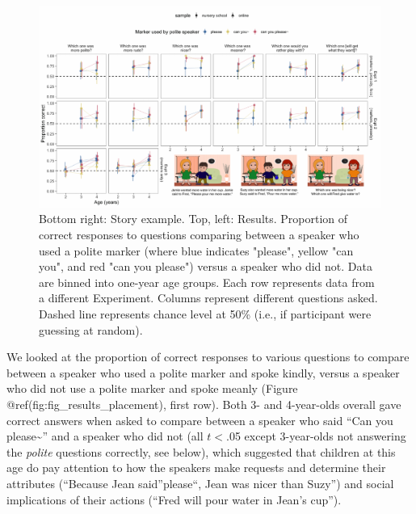 \documentclass[10pt, letterpaper]{article}
\newenvironment{CodeChunk}{}{}
\begin{document}
\begin{CodeChunk}
\captionsetup{width=0.8\textwidth}\begin{figure}[h]

{\centering \includegraphics{figs/fig_results_placement-1} 

}

\caption[Bottom right]{Bottom right: Story example. Top, left: Results. Proportion of correct responses to questions comparing between a speaker who used a polite marker (where blue indicates "please", yellow "can you", and red "can you please") versus a speaker who did not. Data are binned into one-year age groups. Each row represents data from a different Experiment. Columns represent different questions asked. Dashed line represents chance level at 50\% (i.e., if participant were guessing at random).}\label{fig:fig_results_placement}
\end{figure}
\end{CodeChunk}

We looked at the proportion of correct responses to various questions to
compare between a speaker who used a polite marker and spoke kindly,
versus a speaker who did not use a polite marker and spoke meanly
(Figure @ref(fig:fig\_results\_placement), first row). Both 3- and
4-year-olds overall gave correct answers when asked to compare between a
speaker who said ``Can you please\textasciitilde{}'' and a speaker who
did not (all \(t<\).05 except 3-year-olds not answering the
\emph{polite} questions correctly, see below), which suggested that
children at this age do pay attention to how the speakers make requests
and determine their attributes (``Because Jean said''please``, Jean was
nicer than Suzy'') and social implications of their actions (``Fred will
pour water in Jean's cup'').
\end{document}
